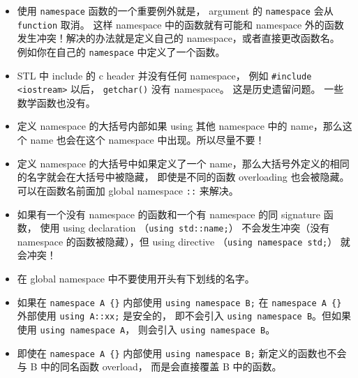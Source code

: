 
\begin{issues}
\issueDraft
\end{issues}

\begin{itemize}
\item 使用 \verb|namespace| 函数的一个重要例外就是， argument 的 \verb|namespace| 会从 \verb|function| 取消。 这样 namespace 中的函数就有可能和 namespace 外的函数发生冲突！解决的办法就是定义自己的 namespace，或者直接更改函数名。 例如你在自己的 \verb|namespace| 中定义了一个函数。
\item STL 中 include 的 c header 并没有任何 namespace， 例如 \verb|#include <iostream>| 以后， \verb|getchar()| 没有 namespace。 这是历史遗留问题。 一些数学函数也没有。
\item 定义 namespace 的大括号内部如果 using 其他 namespace 中的 name，那么这个 name 也会在这个 namespace 中出现。所以尽量不要！
\item 定义 namespace 的大括号中如果定义了一个 name，那么大括号外定义的相同的名字就会在大括号中被隐藏， 即使是不同的函数 overloading 也会被隐藏。 可以在函数名前面加 global namespace \verb|::| 来解决。
\item 如果有一个没有 namespace 的函数和一个有 namespace 的同 signature 函数， 使用 using declaration （\verb|using std::name;|） 不会发生冲突（没有 namespace 的函数被隐藏），但 using directive （\verb|using namespace std;|） 就会冲突！
\item 在 global namespace 中不要使用开头有下划线的名字。
\item 如果在 \verb|namespace A {}| 内部使用 \verb|using namespace B;| 在 \verb|namespace A {}| 外部使用 \verb|using A::xx;| 是安全的， 即不会引入 \verb|using namespace B|。但如果使用 \verb|using namespace A|， 则会引入 \verb|using namespace B|。
\item 即使在 \verb|namespace A {}| 内部使用 \verb|using namespace B;|  新定义的函数也不会与 B 中的同名函数 overload， 而是会直接覆盖 B 中的函数。
\end{itemize}
